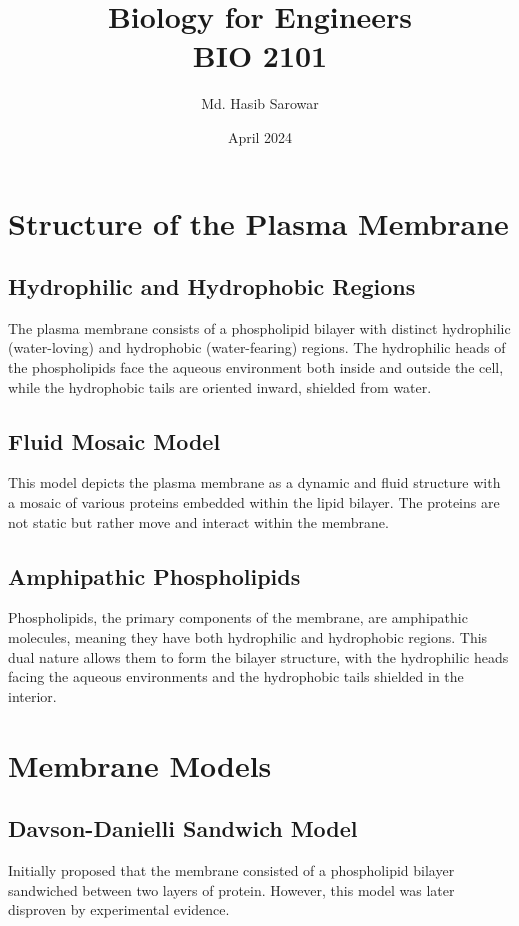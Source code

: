 \documentclass{article}
\title{Biology for Engineers \\ BIO 2101}
\author{Md. Hasib Sarowar}
\date{April 2024}
\begin{document}
\maketitle
\newpage

\section{Structure of the Plasma Membrane}

\subsection{Hydrophilic and Hydrophobic Regions}
The plasma membrane consists of a phospholipid bilayer with distinct hydrophilic (water-loving) and hydrophobic (water-fearing) regions. The hydrophilic heads of the phospholipids face the aqueous environment both inside and outside the cell, while the hydrophobic tails are oriented inward, shielded from water.

\subsection{Fluid Mosaic Model}
This model depicts the plasma membrane as a dynamic and fluid structure with a mosaic of various proteins embedded within the lipid bilayer. The proteins are not static but rather move and interact within the membrane.

\subsection{Amphipathic Phospholipids}
Phospholipids, the primary components of the membrane, are amphipathic molecules, meaning they have both hydrophilic and hydrophobic regions. This dual nature allows them to form the bilayer structure, with the hydrophilic heads facing the aqueous environments and the hydrophobic tails shielded in the interior.

\section{Membrane Models}

\subsection{Davson-Danielli Sandwich Model}
Initially proposed that the membrane consisted of a phospholipid bilayer sandwiched between two layers of protein. However, this model was later disproven by experimental evidence.
\end{document}
